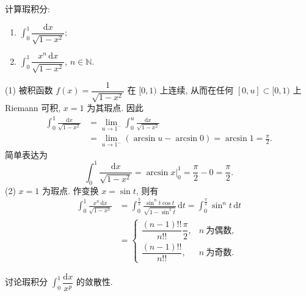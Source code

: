 \begin{example}\label{ex:6.5.8}
计算瑕积分:
\begin{enumerate}[label=(\arabic*)]
\item $\int_{0}^{1}\dfrac{\mathrm{d}x}{\sqrt{1-x^{2}}}$;
\item $\int_{0}^{1}\dfrac{x^{n}\,\mathrm{d}x}{\sqrt{1-x^{2}}}$, $n\in\mathbb{N}$.
\end{enumerate}
\end{example}

\begin{solution}
(1) 被积函数 $f(x)=\dfrac{1}{\sqrt{1-x^{2}}}$ 在 $[0,1)$ 上连续, 从而在任何 $[0,u]\subset[0,1)$ 上 Riemann 可积, $x=1$ 为其瑕点. 因此
\begin{align*}
\int_{0}^{1}\frac{\mathrm{d}x}{\sqrt{1-x^{2}}}&=\lim_{u\to 1^{-}}\int_{0}^{u}\frac{\mathrm{d}x}{\sqrt{1-x^{2}}}\\
&=\lim_{u\to 1^{-}}(\arcsin u-\arcsin0)=\arcsin1=\frac{\pi}{2}.
\end{align*}
简单表达为
\[
\int_{0}^{1}\frac{\mathrm{d}x}{\sqrt{1-x^{2}}}=\arcsin x\bigg|_{0}^{1}=\frac{\pi}{2}-0=\frac{\pi}{2}.
\]
(2) $x=1$ 为瑕点. 作变换 $x=\sin t$, 则有
\begin{align*}
\int_{0}^{1}\frac{x^{n}\,\mathrm{d}x}{\sqrt{1-x^{2}}}&=\int_{0}^{\frac{\pi}{2}}\frac{\sin^{n}t\cos t}{\sqrt{1-\sin^{2}t}}\,\mathrm{d}t=\int_{0}^{\frac{\pi}{2}}\sin^{n}t\,\mathrm{d}t\\
&=\begin{cases}
\dfrac{(n-1)!!}{n!!}\dfrac{\pi}{2}, & n\ \text{为偶数},\\[
3mm]
\dfrac{(n-1)!!}{n!!}, & n\ \text{为奇数}.
\end{cases}
\end{align*}
\end{solution}
\begin{example}\label{ex:6.5.9}
讨论瑕积分 $\int_{0}^{1}\dfrac{\mathrm{d}x}{x^{p}}$ 的敛散性.
\end{example}
